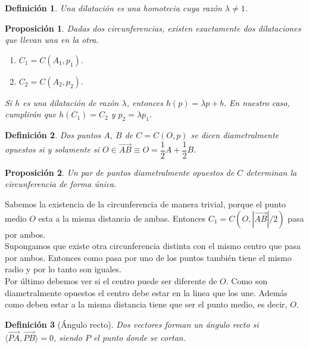 \documentclass[11pt, a4paper]{article}
\makeatletter
\newif\IfInSansMode
\let\oldsf\sffamily
\renewcommand*{\sffamily}{\oldsf\mathversion{sans}\InSansModetrue}
\let\oldnorm\normalfont
\renewcommand*{\normalfont}{\oldnorm\InSansModefalse\mathversion{normal}}
\renewenvironment{proof}[1][\proofname] {\vspace{-15pt}\par\pushQED{\qed}\normalfont\topsep6\p@\@plus6\p@\relax\trivlist\item[\hskip\labelsep\it#1\@addpunct{.}]\ignorespaces}{\popQED\endtrivlist\@endpefalse}
\renewcommand{\vec}{\overrightarrow}
\renewenvironment{proof}[1][\proofname] {\par\pushQED{\qed}\normalfont\topsep6\p@\@plus6\p@\relax\trivlist\item[\hskip\labelsep\itshape\sffamily#1\@addpunct{.}]\ignorespaces}{\popQED\endtrivlist\@endpefalse}
\theoremstyle{theorem-style}
\newtheorem{nprop}{Proposición}[section]
\theoremstyle{definition-style}
\newtheorem{ndef}{Definición}[section]
\theoremstyle{remark-style}
\theoremstyle{example-style}
\makeatother
\begin{document}
\begin{ndef}
	Una dilatación es una homotecia cuya razón $\lambda \ne 1$.
\end{ndef}

\begin{nprop}
  Dadas dos circunferencias, existen exactamente dos dilataciones que llevan una en la otra.
  \begin{enumerate}
  \item $C_1 = C(A_1,p_1)$.
  \item $C_2 = C(A_2,p_2)$.
  \end{enumerate}
  Si $h$ es una dilatación de razón $\lambda$, entonces $h(p) = \lambda p + b$.
  En nuestro caso, cumplirán que $h(C_1) = C_2$ y $p_2 = \lambda p_1$.
\end{nprop}

\begin{ndef}
  Dos puntos $A$, $B$ de $C = C(O,p) $ se dicen diametralmente opuestos si y solamente si $O \in \vec{AB} \equiv O = \dfrac{1}{2}A + \dfrac{1}{2}B$.
\end{ndef}


\begin{nprop}
  Un par de puntos diametralmente opuestos de $C$ determinan la circunferencia de forma única.
\end{nprop}
\begin{proof}
	Sabemos la existencia de la circunferencia de manera trivial, porque el punto medio $O$ esta a la misma distancia de ambas. Entonces $C_1 = C(O, |\vec{AB}|/2)$ pasa por ambos. \\
	Supongamos que existe otra circunferencia  distinta con el mismo centro que pasa por ambos. Entonces como pasa por uno de los puntos también tiene el mismo radio y por lo tanto son iguales.\\
	Por último debemos ver si el centro puede ser diferente de $O$. Como son diametralmente opuestos el centro debe estar en la linea que los une. Además como deben estar a la misma distancia tiene que ser el punto medio, es decir, $O$.
\end{proof}

\begin{ndef}[Ángulo recto]
  Dos vectores forman un ángulo recto si $\langle \vec{PA},\vec{PB}\rangle  = 0$, siendo $P$ el punto donde se cortan.
\end{ndef}
\end{document}
